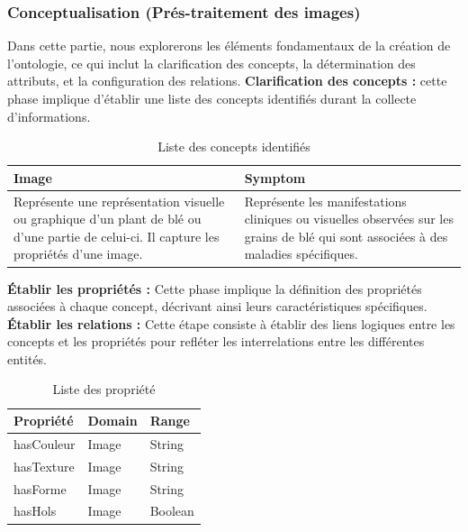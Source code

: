 \documentclass{article}
\begin{document}
		
	\subsubsection{Conceptualisation (Prés-traitement des images)}
	Dans cette partie, nous explorerons les éléments fondamentaux de la création de l'ontologie, ce qui inclut la clarification des concepts, la détermination des attributs, et la configuration des relations.
	\textbf{ Clarification des concepts : } cette phase implique d'établir une liste des concepts identifiés durant la collecte d'informations.
	
	\begin{table}[htbp]
		\centering
		\begin{tabular}{|p{}|p{}|} %
			\hline
			\textbf{Image} & \textbf{Symptom} \\
			\hline
			Représente une représentation visuelle ou graphique d’un plant de blé ou d’une partie de celui-ci. Il capture les propriétés d'une image. & Représente les manifestations cliniques ou visuelles observées sur les grains de blé qui sont associées à des maladies spécifiques. \\
			\hline
		\end{tabular}
		\caption{Liste des concepts identifiés}

	\end{table}
	
	
	
	\textbf{ Établir les propriétés : }Cette phase implique la définition des propriétés associées à chaque concept, décrivant ainsi leurs caractéristiques spécifiques. \\
	
	\textbf{ Établir les relations : }Cette étape consiste à établir des liens logiques entre les concepts et les propriétés pour refléter les interrelations entre les différentes entités.
	
	\begin{table}[htbp]
		\centering
		\begin{tabular}{|p{5cm}|p{5cm}|p{5cm}|} %
			\hline
			\textbf{Propriété} & \textbf{Domain} & \textbf{Range} \\
			\hline
			hasCouleur & Image & String \\
			\hline
			hasTexture & Image & String \\
			\hline
			hasForme & Image & String \\
			\hline
			hasHols & Image & Boolean \\
			\hline
		\end{tabular}
		\caption{Liste des propriété}

	\end{table}
	
\end{document}
